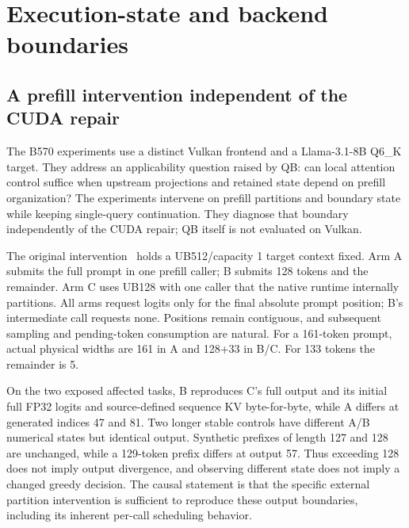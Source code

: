 \section{Execution-state and backend boundaries}
\label{sec:boundaries}
\subsection{A prefill intervention independent of the CUDA repair}
The B570 experiments use a distinct Vulkan frontend and a Llama-3.1-8B Q6\_K target. They address an applicability question raised by QB: can local attention control suffice when upstream projections and retained state depend on prefill organization? The experiments intervene on prefill partitions and boundary state while keeping single-query continuation. They diagnose that boundary independently of the CUDA repair; QB itself is not evaluated on Vulkan.

The original intervention~\cite{bpartition} holds a UB512/capacity 1 target context fixed. Arm A submits the full prompt in one prefill caller; B submits 128 tokens and the remainder. Arm C uses UB128 with one caller that the native runtime internally partitions. All arms request logits only for the final absolute prompt position; B's intermediate call requests none. Positions remain contiguous, and subsequent sampling and pending-token consumption are natural. For a 161-token prompt, actual physical widths are 161 in A and 128+33 in B/C. For 133 tokens the remainder is 5.

On the two exposed affected tasks, B reproduces C's full output and its initial full FP32 logits and source-defined sequence KV byte-for-byte, while A differs at generated indices 47 and 81. Two longer stable controls have different A/B numerical states but identical output. Synthetic prefixes of length 127 and 128 are unchanged, while a 129-token prefix differs at output 57. Thus exceeding 128 does not imply output divergence, and observing different state does not imply a changed greedy decision. The causal statement is that the specific external partition intervention is sufficient to reproduce these output boundaries, including its inherent per-call scheduling behavior.

